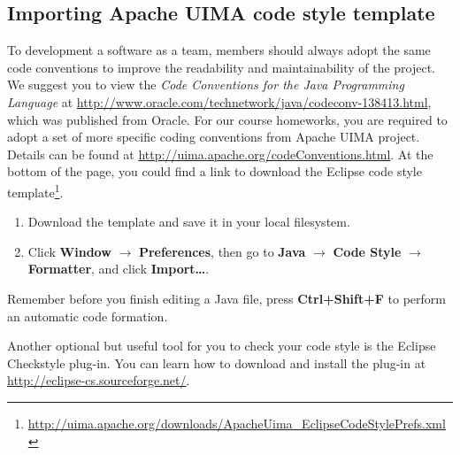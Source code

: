 \subsection{Importing Apache UIMA code style template}

To development a software as a team, members should always adopt the same code
conventions to improve the readability and maintainability of the project. We
suggest you to view the \emph{Code Conventions for the Java Programming
Language} at \url{http://www.oracle.com/technetwork/java/codeconv-138413.html},
which was published from Oracle. For our course homeworks, you are required to
adopt a set of more specific coding conventions from Apache UIMA project.
Details can be found at \url{http://uima.apache.org/codeConventions.html}. At
the bottom of the page, you could find a link to download the Eclipse code style
template\footnote{\url{http://uima.apache.org/downloads/ApacheUima_EclipseCodeStylePrefs.xml}}.

\begin{enumerate}
\item Download the template and save it in your local filesystem.
\item Click \textbf{Window} $\rightarrow$ \textbf{Preferences}, then go to \textbf{Java} $\rightarrow$ \textbf{Code Style} $\rightarrow$ \textbf{Formatter}, and click \textbf{Import\ldots}. 
\end{enumerate}

Remember before you finish editing a Java file, press \textbf{Ctrl+Shift+F} to
perform an automatic code formation.

Another optional but useful tool for you to check your code style is the Eclipse
Checkstyle plug-in. You can learn how to download and install the plug-in at
\url{http://eclipse-cs.sourceforge.net/}.

